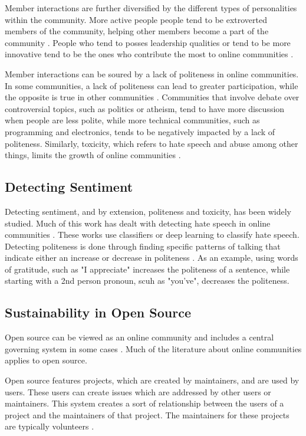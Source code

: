 \documentclass[conference]{IEEEtran}
\begin{document}
Member interactions are further diversified by the different types of personalities within the community. More active people people tend to be extroverted members of the community, helping other members become a part of the community \cite{wang2003assessing}. People who tend to posses leadership qualities or tend to be more innovative tend to be the ones who contribute the most to online communities \cite{jadin2013personality}. 

Member interactions can be soured by a lack of politeness in online communities. In some communities, a lack of politeness can lead to greater participation, while the opposite is true in other communities \cite{burke2008mind}. Communities that involve debate over controversial topics, such as politics or atheism, tend to have more discussion when people are less polite, while more technical communities, such as programming and electronics, tends to be negatively impacted by a lack of politeness. Similarly, toxicity, which refers to hate speech and abuse among other things, limits the growth of online communities \cite{mohan2017impact}. 

\subsection{Detecting Sentiment} 

Detecting sentiment, and by extension, politeness and toxicity, has been widely studied. Much of this work has dealt with detecting hate speech in online communities \cite{warner2012detecting}. These works use classifiers or deep learning to classify hate speech. Detecting politeness is done through finding specific patterns of talking that indicate either an increase or decrease in politeness \cite{danescu2013computational}. As an example, using words of gratitude, such as "I appreciate" increases the politeness of a sentence, while starting with a 2nd person pronoun, scuh as "you've", decreases the politeness. 


\subsection{Sustainability in Open Source} 

Open source can be viewed as an online community and includes a central governing system in some cases \cite{o2007emergence}. Much of the literature about online communities applies to open source. 

Open source features projects, which are created by maintainers, and are used by users. These users can create issues which are addressed by other users or maintainers. This system creates a sort of relationship between the users of a project and the maintainers of that project. The maintainers for these projects are typically volunteers \cite{raymond1999cathedral}. 
\end{document}

